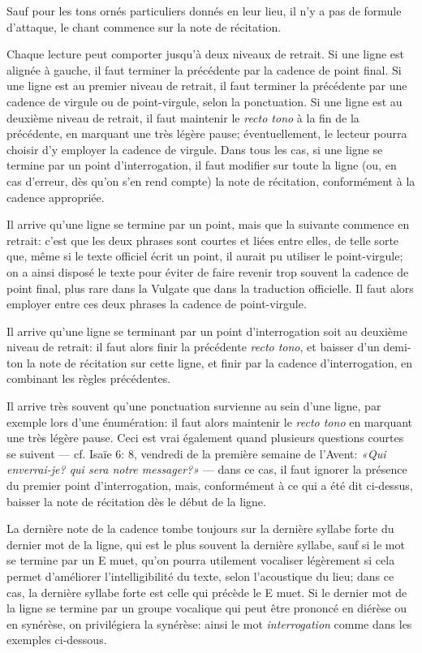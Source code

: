 \documentclass[twoside, french]{book}
\begin{document}
Sauf pour les tons ornés particuliers donnés en leur lieu, il n'y a pas de formule d'attaque, le chant commence sur la note de récitation.

Chaque lecture peut comporter jusqu'à deux niveaux de retrait.
Si une ligne est alignée à gauche, il faut terminer la précédente par la cadence de point final.
Si une ligne est au premier niveau de retrait, il faut terminer la précédente par une cadence de virgule ou de point-virgule, selon la ponctuation.
Si une ligne est au deuxième niveau de retrait, il faut maintenir le \emph{recto tono} à la fin de la précédente, en marquant une très légère pause;
éventuellement, le lecteur pourra choisir d'y employer la cadence de virgule.
Dans tous les cas, si une ligne se termine par un point d'interrogation, il faut modifier sur toute la ligne
(ou, en cas d'erreur, dès qu'on s'en rend compte) la note de récitation, conformément à la cadence appropriée.

Il arrive qu'une ligne se termine par un point, mais que la suivante commence en retrait:
c'est que les deux phrases sont courtes et liées entre elles, de telle sorte que, même si le texte officiel écrit un point, il aurait pu utiliser le point-virgule;
on a ainsi disposé le texte pour éviter de faire revenir trop souvent la cadence de point final, plus rare dans la Vulgate que dans la traduction officielle.
Il faut alors employer entre ces deux phrases la cadence de point-virgule.

Il arrive qu'une ligne se terminant par un point d'interrogation soit au deuxième niveau de retrait:
il faut alors finir la précédente \emph{recto tono}, et baisser d'un demi-ton la note de récitation sur cette ligne, et finir par la cadence d'interrogation, en combinant les règles précédentes.

Il arrive très souvent qu'une ponctuation survienne au sein d'une ligne, par exemple lors d'une énumération:
il faut alors maintenir le \emph{recto tono} en marquant une très légère pause.
Ceci est vrai également quand plusieurs questions courtes se suivent
--- cf. Isaïe 6: 8, vendredi de la première semaine de l'Avent: \emph{«Qui enverrai-je? qui sera notre messager?»} ---
dans ce cas, il faut ignorer la présence du premier point d'interrogation, mais, conformément à ce qui a été dit ci-dessus, baisser la note de récitation dès le début de la ligne.

La dernière note de la cadence tombe toujours sur la dernière syllabe forte du dernier mot de la ligne, qui est le plus souvent la dernière syllabe,
sauf si le mot se termine par un E muet, qu'on pourra utilement vocaliser légèrement si cela permet d'améliorer l'intelligibilité du texte, selon l'acoustique du lieu;
dans ce cas, la dernière syllabe forte est celle qui précède le E muet. Si le dernier mot de la ligne se termine par un groupe vocalique qui peut être prononcé
en diérèse ou en synérèse, on privilégiera la synérèse: ainsi le mot \emph{interrogation} comme dans les exemples ci-dessous.
\end{document}
